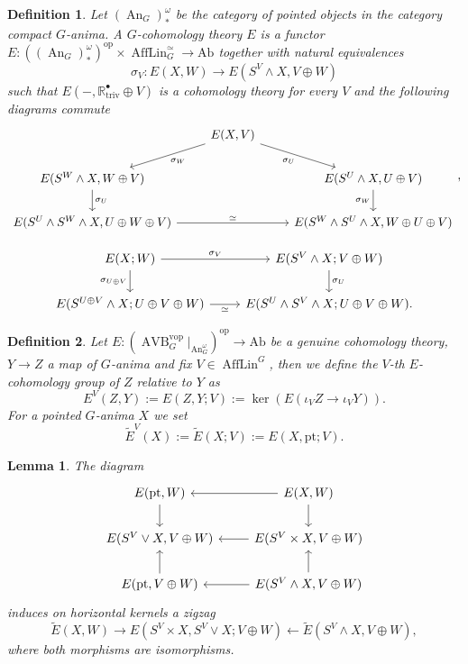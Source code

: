\documentclass{article}
\newcommand{\R}{\mathbb{R}} %
\newcommand{\Ab}{\mathrm{Ab}}
\newcommand{\pt}{\mathrm{pt}}
\newcommand{\op}{\mathrm{op}}
\newcommand{\vop}{\mathrm{vop}}
\DeclareMathOperator{\AVB}{AVB}
\DeclareMathOperator{\An}{An}
\DeclareMathOperator{\AffLin}{AffLin}
\newtheorem{lemma}{Lemma}
\newtheorem{definition}{Definition}
\begin{document}
\begin{definition}
Let $(\An_G)^\omega_*$ be the category of pointed objects in the category compact $G$-anima.
A \emph{$G$-cohomology theory $E$} is a functor $E \colon ((\An_G)^\omega_*)^\op \times \AffLin_G^\simeq \to \Ab$
together with natural equivalences 
\[
    \sigma_V \colon E(X,W) \to E(S^V \wedge X, V \oplus W)
\]
such that 
$E(-, \R^\bullet_{\mathrm{triv}} \oplus V)$ is a cohomology theory for every $V$ and the following diagrams commute
\[\begin{tikzcd}
	& {E(X,V)} \\
	{E(S^W\wedge X,W\oplus V)} && {E(S^U\wedge X, U \oplus V)} \\
	{E(S^U\wedge S^W \wedge X, U \oplus W \oplus V)} && {E(S^W \wedge S^U \wedge X, W \oplus U \oplus V)}
	\arrow["{\sigma_W}", from=1-2, to=2-1]
	\arrow["{\sigma_U}"', from=1-2, to=2-3]
	\arrow["{\sigma_U}", from=2-1, to=3-1]
	\arrow["{\sigma_W}"', from=2-3, to=3-3]
	\arrow["\simeq", from=3-1, to=3-3]
\end{tikzcd},\]

\[\begin{tikzcd}
	{E(X;W)} & {E(S^V \wedge X; V \oplus W)} \\
	{E(S^{U \oplus V} \wedge X; U \oplus V \oplus W)} & {E(S^U \wedge S^V \wedge X;U \oplus V \oplus W)}
	\arrow["{\sigma_V}", from=1-1, to=1-2]
	\arrow["\simeq"', from=2-1, to=2-2]
	\arrow["{\sigma_U}", from=1-2, to=2-2]
	\arrow["{\sigma_{U\oplus V}}"', from=1-1, to=2-1].
\end{tikzcd}\]


\end{definition}

\begin{definition}
    Let $E \colon (\AVB^\vop_G|_{\An_G^\omega})^\op \to \Ab$ be a genuine cohomology theory, $Y \to Z$ a map of $G$-anima and fix $V \in \AffLin^G$, then we define 
    the $V$-th $E$-cohomology group of $Z$ relative to $Y$ as
    \[
      E^V(Z,Y) := E(Z,Y;V) := \ker ( E(\iota_V Z \to \iota_V Y)). 
    \]
    For a pointed $G$-anima $X$ we set 
    \[
      \tilde E^V(X) := \tilde E(X;V) := E(X, \pt; V).
    \]
\end{definition}
\begin{lemma}

    The diagram 
    \[\begin{tikzcd}
        {E(\pt, W)} & {E(X,W)} \\
        {E(S^V\vee X,V \oplus W)} & {E(S^V \times X, V \oplus W)} \\
        {E(\pt, V \oplus W)} & {E(S^V \wedge X, V \oplus W)}
        \arrow[from=1-2, to=1-1]
        \arrow[from=1-1, to=2-1]
        \arrow[from=2-2, to=2-1]
        \arrow[from=1-2, to=2-2]
        \arrow[from=3-2, to=2-2]
        \arrow[from=3-1, to=2-1]
        \arrow[from=3-2, to=3-1]
    \end{tikzcd}\]
    induces on horizontal kernels a zigzag 
    \[
    \tilde E(X,W) \to E(S^V \times X, S^V \vee X ; V \oplus W) \leftarrow \tilde E(S^V \wedge X, V \oplus W),
    \]
    where both morphisms are isomorphisms.
\end{lemma}
\end{document}

